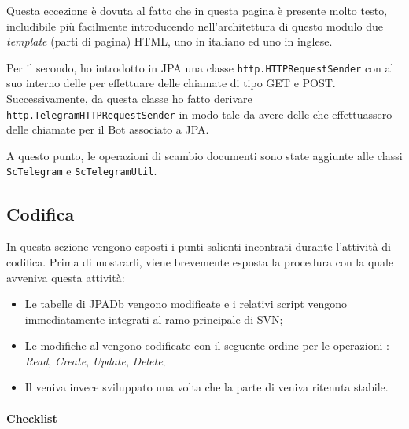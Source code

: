 Questa eccezione è dovuta al fatto che in questa pagina è presente molto testo,
includibile più facilmente introducendo nell'architettura di questo modulo due
\emph{template} (parti di pagina) HTML, uno in italiano ed uno in inglese.

Per il secondo, ho introdotto in JPA una classe
\texttt{http.HTTPRequestSender} con al suo interno delle  per
effettuare delle chiamate  di tipo GET e POST. Successivamente, da
questa classe ho fatto derivare \texttt{http.TelegramHTTPRequestSender} in modo
tale da avere delle  che effettuassero delle chiamate per il Bot
associato a JPA.

A questo punto, le operazioni di scambio documenti sono state aggiunte alle
classi \texttt{ScTelegram} e \texttt{ScTelegramUtil}.


\subsection{Codifica}

In questa sezione vengono esposti i punti salienti incontrati durante
l'attività di codifica. Prima di mostrarli, viene brevemente esposta la
procedura con la quale avveniva questa attività:

\begin{itemize}
\item Le tabelle di JPADb vengono modificate e i relativi script vengono
  immediatamente integrati al ramo principale di SVN;
\item Le modifiche al \BKEND{} vengono codificate con il seguente ordine per le
  operazioni : \emph{Read}, \emph{Create}, \emph{Update},
  \emph{Delete};
\item Il \FREND{} veniva invece sviluppato una volta che la parte di \BKEND{}
  veniva ritenuta stabile.
\end{itemize}

\paragraph{Checklist} \mbox{} \\

